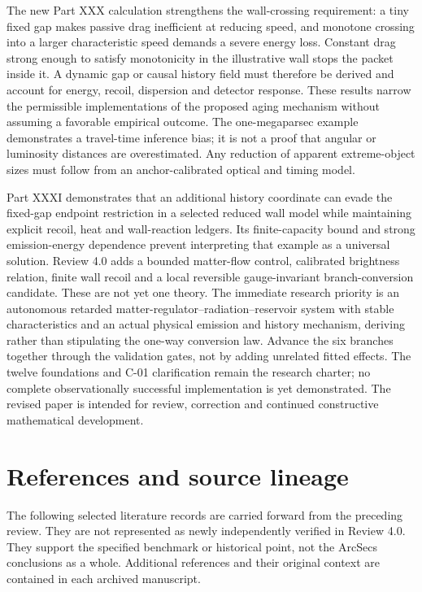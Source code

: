 \documentclass[
  11pt,
  twoside]{article}
\begin{document}
The new Part XXX calculation strengthens the wall-crossing requirement:
a tiny fixed gap makes passive drag inefficient at reducing speed, and
monotone crossing into a larger characteristic speed demands a severe
energy loss. Constant drag strong enough to satisfy monotonicity in the
illustrative wall stops the packet inside it. A dynamic gap or causal
history field must therefore be derived and account for energy, recoil,
dispersion and detector response. These results narrow the permissible
implementations of the proposed aging mechanism without assuming a
favorable empirical outcome. The one-megaparsec example demonstrates a
travel-time inference bias; it is not a proof that angular or luminosity
distances are overestimated. Any reduction of apparent extreme-object
sizes must follow from an anchor-calibrated optical and timing model.

Part XXXI demonstrates that an additional history coordinate can evade
the fixed-gap endpoint restriction in a selected reduced wall model
while maintaining explicit recoil, heat and wall-reaction ledgers. Its
finite-capacity bound and strong emission-energy dependence prevent
interpreting that example as a universal solution. Review 4.0 adds a
bounded matter-flow control, calibrated brightness relation, finite wall
recoil and a local reversible gauge-invariant branch-conversion
candidate. These are not yet one theory. The immediate research priority
is an autonomous retarded matter-regulator--radiation--reservoir system
with stable characteristics and an actual physical emission and history
mechanism, deriving rather than stipulating the one-way conversion law.
Advance the six branches together through the validation gates, not by
adding unrelated fitted effects. The twelve foundations and C-01
clarification remain the research charter; no complete observationally
successful implementation is yet demonstrated. The revised paper is
intended for review, correction and continued constructive mathematical
development.

\section{References and source
lineage}\label{references-and-source-lineage}

The following selected literature records are carried forward from the
preceding review. They are not represented as newly independently
verified in Review 4.0. They support the specified benchmark or
historical point, not the ArcSecs conclusions as a whole. Additional
references and their original context are contained in each archived
manuscript.
\end{document}
